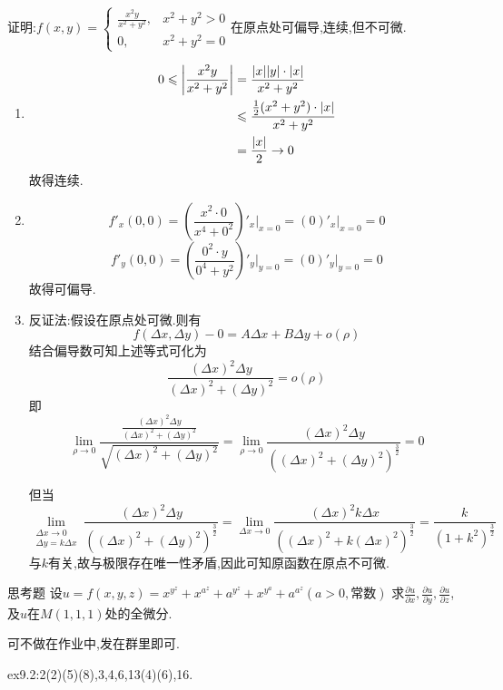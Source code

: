 \begin{example}
    证明:$f(x,y)=\begin{cases}
    \frac{x^2y}{x^2+y^2},&x^2+y^2>0\\
    0,&x^2+y^2=0
    \end{cases}$在原点处可偏导,连续,但不可微.
\end{example}
\begin{solution}
    \begin{enumerate}
        \item \begin{align*}
            0\leqslant\left|\frac{x^2y}{x^2+y^2}\right|
            &=\frac{|x||y|\cdot |x|}{x^2+y^2}\\
            &\leqslant\frac{\frac{1}{2}(x^2+y^2)\cdot |x|}{x^2+y^2}\\
            &=\frac{|x|}{2}\to 0
        \end{align*}
        故得连续.
        \item $$f'_x(0,0)=(\frac{x^2\cdot0}{x^4+0^2})'_x\bigg|_{x=0}=(0)'_x|_{x=0}=0$$
        $$f'_y(0,0)=(\frac{0^2\cdot y}{0^4+y^2})'_y\bigg|_{y=0}=(0)'_y\bigg|_{y=0}=0$$
        故得可偏导.
        \item 反证法:假设在原点处可微.则有$$f(\Delta x,\Delta y)-0=A\Delta x+B\Delta y+o(\rho)$$
        结合偏导数可知上述等式可化为
        $$\frac{(\Delta x)^2\Delta y}{(\Delta x)^2+(\Delta y)^2}=o(\rho)$$
        即$$\lim_{\rho \to 0}\frac{\frac{(\Delta x)^2\Delta y}{(\Delta x)^2+(\Delta y)^2}}{\sqrt{(\Delta x)^2+(\Delta y)^2}}=\lim_{\rho \to 0}\frac{(\Delta x)^2\Delta y}{((\Delta x)^2+(\Delta y)^2)^\frac{3}{2}}=0$$

        但当$$\lim_{\substack{\Delta x\to 0\\\Delta y=k\Delta x}}\frac{(\Delta x)^2\Delta y}{((\Delta x)^2+(\Delta y)^2)^\frac{3}{2}}=\lim_{\Delta x\to 0}\frac{(\Delta x)^2k\Delta x}{((\Delta x)^2+k(\Delta x)^2)^\frac{3}{2}}=\frac{k}{(1+k^2)^{\frac{3}{2}}}$$与$k$有关,故与极限存在唯一性矛盾,因此可知原函数在原点不可微.
    \end{enumerate}
\end{solution}

\begin{example}{思考题}
    设$u=f(x,y,z)=x^{y^z}+x^{a^z}+a^{y^z}+x^{y^a}+a^{a^z}(a>0,\text{常数})$
    求$\frac{\partial u}{\partial x},\frac{\partial u}{\partial y},\frac{\partial u}{\partial z}$,及$u$在$M(1,1,1)$处的全微分.
\end{example}
可不做在作业中,发在群里即可.

\begin{homework} 
    ex9.2:2(2)(5)(8),3,4,6,13(4)(6),16.
\end{homework}
